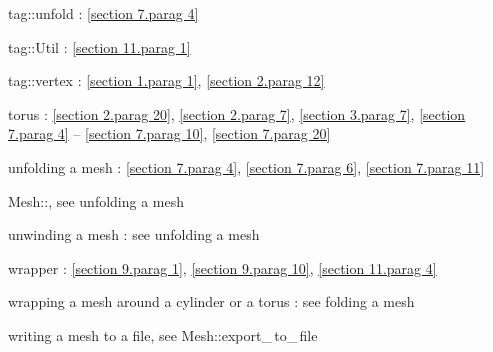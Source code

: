 \documentclass[a4paper]{scrreprt}
\def\numb{}
\newcommand\verm[1]{\textcolor{manif}{#1}}
\renewcommand\tt{\normalfont\ttfamily}
\begin{document}
\noindent
{\small\tt\textcolor{tag}{tag}::unfold} : \ref{\numb section 7.\numb parag 4}

\noindent
{\small\tt\textcolor{tag}{tag}::Util} : \ref{\numb section 11.\numb parag 1}
  
\noindent
{\small\tt\textcolor{tag}{tag}::vertex} : \ref{\numb section 1.\numb parag 1},
\ref{\numb section 2.\numb parag 12}
  
\noindent
torus : \ref{\numb section 2.\numb parag 20}, \ref{\numb section 2.\numb parag 7},
\ref{\numb section 3.\numb parag 7},
\ref{\numb section 7.\numb parag 4} -- \ref{\numb section 7.\numb parag 10},
\ref{\numb section 7.\numb parag 20}

\noindent
unfolding a mesh : \ref{\numb section 7.\numb parag 4}, \ref{\numb section 7.\numb parag 6},
\ref{\numb section 7.\numb parag 11}

\noindent
{\small\tt\verm{Mesh}::}, see unfolding a mesh

\noindent
unwinding a mesh : see unfolding a mesh

\noindent
wrapper : \ref{\numb section 9.\numb parag 1}, \ref{\numb section 9.\numb parag 10},
\ref{\numb section 11.\numb parag 4}

\noindent
wrapping a mesh around a cylinder or a torus : see folding a mesh

\noindent
writing a mesh to a file, see {\small\tt\verm{Mesh}::export\_\,to\_\,file}
\end{document}
